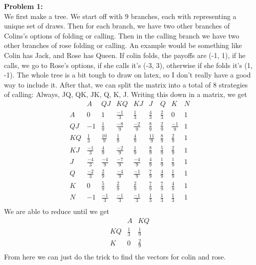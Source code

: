 \documentclass[12pt]{article}
\begin{document}
\noindent
\textbf{Problem 1:}\\
We first make a tree. We start off with 9 branches, each with representing a unique
set of draws. Then for each branch, we have two other branches of Colins's options of folding
or calling. Then in the calling branch we have two other branches of rose folding or calling.
An example would be something like Colin has Jack, and Rose has Queen. If colin folds, the payoffs 
are (-1, 1), if he calls, we go to Rose's options, if she calls it's (-3, 3), otherwise if she
folds it's (1, -1). The whole tree is a bit tough to draw on latex, so I don't really have a good way to include it.
After that, we can split the matrix into a total of 8 strategies of calling: Always, JQ, QK, JK, Q, K, J. Writing this down in a matrix, we get 
\[
\begin{array}{c|cccccccc}
 & A & QJ & KQ & KJ & J & Q & K & N \\
\hline
A & 0 & 1 & \frac{-1}{3} & \frac{1}{3} & \frac{4}{3} & \frac{2}{3} & 0 & 1 \\
QJ & -1 	& \frac{1}{9} &\frac{-8}{9} &\frac{-2}{9} &\frac{8}{9} &\frac{2}{9} &\frac{-1}{9} & 1\\
KQ & \frac{1}{3} & \frac{10}{9}& \frac{1}{9}& \frac{4}{9}& \frac{11}{9}& \frac{8}{9}& \frac{2}{9}&1 \\
KJ & \frac{-1}{3}& \frac{4}{9}& \frac{-2}{9}& \frac{1}{9}& \frac{8}{9}& \frac{5}{9}& \frac{2}{9}&1 \\
J & \frac{-4}{3}& \frac{-4}{9}& \frac{-7}{9}& \frac{-4}{9}& \frac{4}{9}& \frac{1}{9}& \frac{1}{9}&1 \\
Q & \frac{-2}{3}& \frac{2}{9}& \frac{-4}{9}& \frac{-1}{9}& \frac{7}{9}& \frac{4}{9}& \frac{1}{9}&1 \\
K & 0 & \frac{5}{9}& \frac{2}{9}& \frac{2}{9}& \frac{7}{9}& \frac{7}{9}& \frac{4}{9}&1 \\
N & -1 & \frac{-1}{3}& \frac{-1}{3}& \frac{-1}{3}& \frac{1}{3}& \frac{1}{3}& \frac{1}{3}&1 \\
\end{array}
\]
We are able to reduce until we get 
\[
\begin{array}{c|cc}
      & A & KQ \\
\hline
    KQ & \frac{1}{3} & \frac{1}{9} \\
    K & 0 & \frac{2}{9} \\
\end{array}
\]
From here we can just do the trick to find the vectors for colin and rose.
\end{document}
